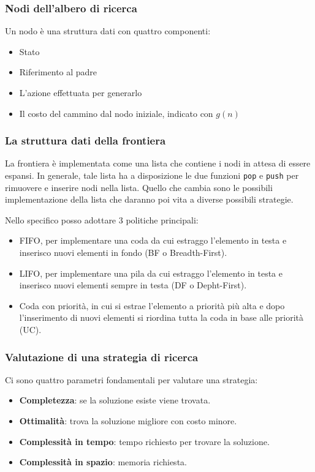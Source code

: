 \subsubsection{Nodi dell'albero di ricerca}
Un nodo \`e una struttura dati con quattro componenti:
\begin{itemize}
	\item Stato
	\item Riferimento al padre
	\item L'azione effettuata per generarlo
	\item Il costo del cammino dal nodo iniziale, indicato con $g(n)$
\end{itemize}

\subsubsection{La struttura dati della frontiera}
La frontiera \`e implementata come una lista che contiene i nodi in attesa di essere espansi.
In generale, tale lista ha a disposizione le due funzioni \verb|pop| e \verb|push| per rimuovere
e inserire nodi nella lista. Quello che cambia sono le possibili implementazione della lista
che daranno poi vita a diverse possibili strategie.

Nello specifico posso adottare 3 politiche principali:
\begin{itemize}
	\item FIFO, per implementare una coda da cui estraggo l'elemento in testa e inserisco
	      nuovi elementi in fondo (BF o Breadth-First).
	\item LIFO, per implementare una pila da cui estraggo l'elemento in testa e inserisco nuovi
	      elementi sempre in testa (DF o Depht-First).
	\item Coda con priorit\`a, in cui si estrae l'elemento a priorit\`a pi\`u alta e dopo
	      l'inserimento di nuovi elementi si riordina tutta la coda in base alle priorit\`a
	      (UC).
\end{itemize}

\subsubsection{Valutazione di una strategia di ricerca}
Ci sono quattro parametri fondamentali per valutare una strategia:
\begin{itemize}
	\item \textbf{Completezza}: se la soluzione esiste viene trovata.
	\item \textbf{Ottimalit\`a}: trova la soluzione migliore con costo minore.
	\item \textbf{Complessit\`a in tempo}: tempo richiesto per trovare la soluzione.
	\item \textbf{Complessit\`a in spazio}: memoria richiesta.
\end{itemize}